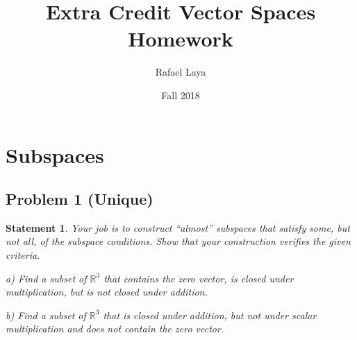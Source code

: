 \documentclass[12pt, letterpaper]{article}
\title{Extra Credit Vector Spaces Homework}
\author{Rafael Laya}
\date{Fall 2018}
\newcommand{\R}{\mathbb{R}}
\theoremstyle{statement}
\theoremstyle{statement}
\newtheorem*{atmStat}{Statement}
\begin{document}
    \maketitle
 
    \section*{Subspaces}
    \subsection*{Problem 1 (Unique)}
    \begin{atmStat}
    Your job is to construct ``almost'' subspaces that satisfy some, but not all, of the subspace conditions. Show that your construction verifies the given criteria.
    
    a) Find a subset of $\R^3$ that contains the zero vector, is closed under multiplication, but is not closed under addition.
    
    b) Find a subset of $\R^3$ that is closed under addition, but not under scalar multiplication and does not contain the zero vector. 
    \end{atmStat}
\end{document}
